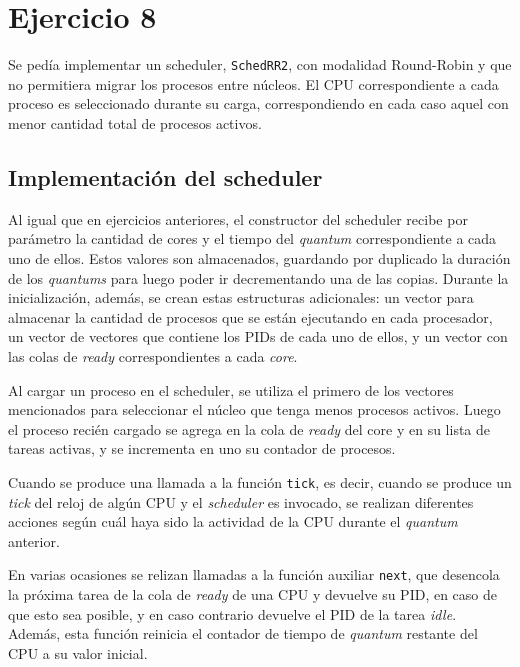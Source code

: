 \section{Ejercicio 8}

Se pedía implementar un scheduler, \texttt{SchedRR2}, con modalidad Round-Robin
y que no permitiera migrar los procesos entre núcleos. El CPU correspondiente a
cada proceso es seleccionado durante su carga, correspondiendo en cada caso
aquel con menor cantidad total de procesos activos.

\subsection{Implementación del scheduler}

Al igual que en ejercicios anteriores, el constructor del scheduler recibe por
parámetro la cantidad de cores y el tiempo del \emph{quantum} correspondiente a
cada uno de ellos. Estos valores son almacenados, guardando por duplicado la
duración de los \emph{quantums} para luego poder ir decrementando una de las
copias. Durante la inicialización, además, se crean estas estructuras
adicionales: un vector para almacenar la cantidad de procesos que se están
ejecutando en cada procesador, un vector de vectores que contiene los PIDs de
cada uno de ellos, y un vector con las colas de \emph{ready} correspondientes a
cada \emph{core}.

Al cargar un proceso en el scheduler, se utiliza el primero de los vectores
mencionados para seleccionar el núcleo que tenga menos procesos activos. Luego
el proceso recién cargado se agrega en la cola de \emph{ready} del core y en su
lista de tareas activas, y se incrementa en uno su contador de procesos.

Cuando se produce una llamada a la función \texttt{tick}, es decir, cuando se
produce un \emph{tick} del reloj de algún CPU y el \emph{scheduler} es invocado,
se realizan diferentes acciones según cuál haya sido la actividad de la CPU
durante el \emph{quantum} anterior.

En varias ocasiones se relizan llamadas a la función auxiliar \texttt{next}, que
desencola la próxima tarea de la cola de \emph{ready} de una CPU y devuelve su
PID, en caso de que esto sea posible, y en caso contrario devuelve el PID de la tarea \emph{idle}. Además, esta función reinicia el contador de tiempo de
\emph{quantum} restante del CPU a su valor inicial.

